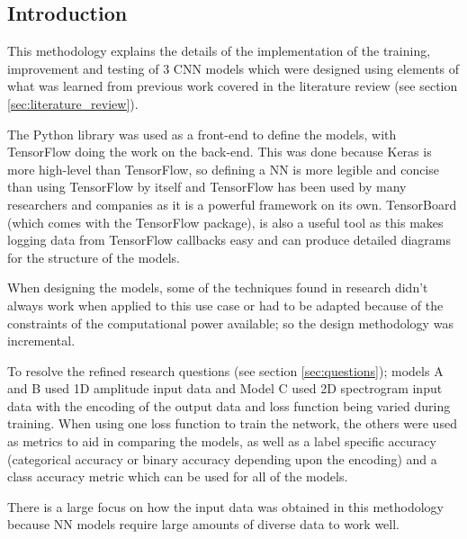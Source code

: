 \documentclass[12pt]{article}
\begin{document}
	\subsection{Introduction}
	This methodology explains the details of the implementation of the training, improvement and testing of 3 CNN models which were designed using elements of what was learned from previous work covered in the literature review (see section \ref{sec:literature_review}).\medskip
	
	The \textcite{Keras} Python library was used as a front-end to define the models, with TensorFlow doing the work on the back-end. This was done because Keras is more high-level than TensorFlow, so defining a NN is more legible and concise than using TensorFlow by itself and TensorFlow has been used by many researchers and companies as it is a powerful framework on its own. TensorBoard (which comes with the TensorFlow package), is also a useful tool as this makes logging data from TensorFlow callbacks easy and can produce detailed diagrams for the structure of the models.\medskip
	
	When designing the models, some of the techniques found in research didn't always work when applied to this use case or had to be adapted because of the constraints of the computational power available; so the design methodology was incremental.\medskip 
	
	To resolve the refined research questions (see section \ref{sec:questions}); models A and B used 1D amplitude input data and Model C used 2D spectrogram input data with the encoding of the output data and loss function being varied during training. When using one loss function to train the network, the others were used as metrics to aid in comparing the models, as well as a label specific accuracy (categorical accuracy or binary accuracy depending upon the encoding) and a class accuracy metric which can be used for all of the models.\medskip
	
	There is a large focus on how the input data was obtained in this methodology because NN models require large amounts of diverse data to work well.\medskip
	
\end{document}
